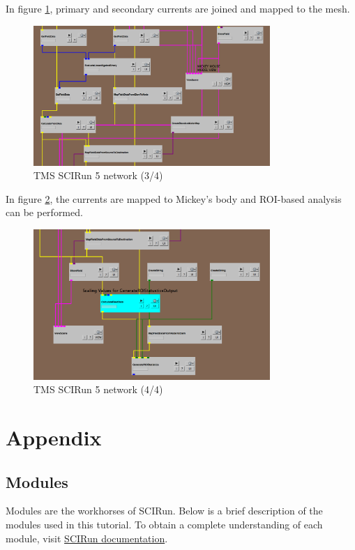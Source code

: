 \documentclass[fleqn,11pt,openany]{book}
\begin{document}
In figure \ref{fig:tms3}, primary and secondary currents are joined and mapped to the mesh.

 \begin{figure}[!h]
\centering
\includegraphics[width=0.8\textwidth]{BrainStimulation_figures/tms3.png}
\caption{ TMS SCIRun 5 network (3/4)}
\label{fig:tms3}
\end{figure}

In figure \ref{fig:tms4}, the currents are mapped to Mickey's body and ROI-based analysis can be performed.


 \begin{figure}[!h]
\centering
\includegraphics[width=0.8\textwidth]{BrainStimulation_figures/tms4.png}
\caption{ TMS SCIRun 5 network (4/4)}
\label{fig:tms4}
\end{figure}

\chapter{Appendix}

\section{Modules}

Modules are the workhorses of SCIRun. Below is a brief description of the modules used in this tutorial. To obtain a complete understanding of each module, visit \href{http://www.sci.utah.edu/software/scirun.html}{SCIRun documentation}.
\end{document}
